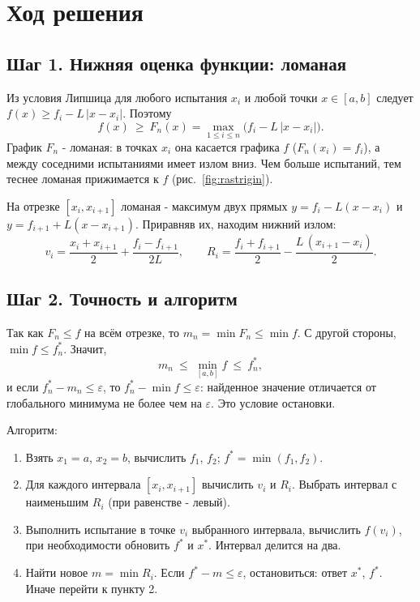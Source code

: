 \documentclass[a4paper,12pt]{article}
\begin{document}
\section{Ход решения}

\subsection*{Шаг 1. Нижняя оценка функции: ломаная}

Из условия Липшица для любого испытания $x_i$ и любой точки $x \in [a,b]$ следует $f(x) \ge f_i - L\,|x - x_i|$. Поэтому
\[
f(x) \ \ge\ F_n(x) = \max_{1 \le i \le n}\bigl(f_i - L\,|x - x_i|\bigr).
\]
График $F_n$ - ломаная: в точках $x_i$ она касается графика $f$ ($F_n(x_i) = f_i$), а между соседними испытаниями имеет излом вниз. Чем больше испытаний, тем теснее ломаная прижимается к $f$ (рис.~\ref{fig:rastrigin}).

На отрезке $[x_i, x_{i+1}]$ ломаная - максимум двух прямых $y = f_i - L(x - x_i)$ и $y = f_{i+1} + L(x - x_{i+1})$. Приравняв их, находим нижний излом:
\[
v_i = \frac{x_i + x_{i+1}}{2} + \frac{f_i - f_{i+1}}{2L},
\qquad
R_i = \frac{f_i + f_{i+1}}{2} - \frac{L\,(x_{i+1} - x_i)}{2}.
\]

\subsection*{Шаг 2. Точность и алгоритм}

Так как $F_n \le f$ на всём отрезке, то $m_n = \min F_n \le \min f$. С другой стороны, $\min f \le f^*_n$. Значит,
\[
m_n \ \le\ \min_{[a,b]} f \ \le\ f^*_n,
\]
и если $f^*_n - m_n \le \varepsilon$, то $f^*_n - \min f \le \varepsilon$: найденное значение отличается от глобального минимума не более чем на $\varepsilon$. Это условие остановки.

Алгоритм:
\begin{enumerate}
\item Взять $x_1 = a$, $x_2 = b$, вычислить $f_1$, $f_2$; $f^* = \min(f_1, f_2)$.
\item Для каждого интервала $[x_i, x_{i+1}]$ вычислить $v_i$ и $R_i$. Выбрать интервал с наименьшим $R_i$ (при равенстве - левый).
\item Выполнить испытание в точке $v_i$ выбранного интервала, вычислить $f(v_i)$, при необходимости обновить $f^*$ и $x^*$. Интервал делится на два.
\item Найти новое $m = \min R_i$. Если $f^* - m \le \varepsilon$, остановиться: ответ $x^*$, $f^*$. Иначе перейти к пункту 2.
\end{enumerate}
\end{document}
